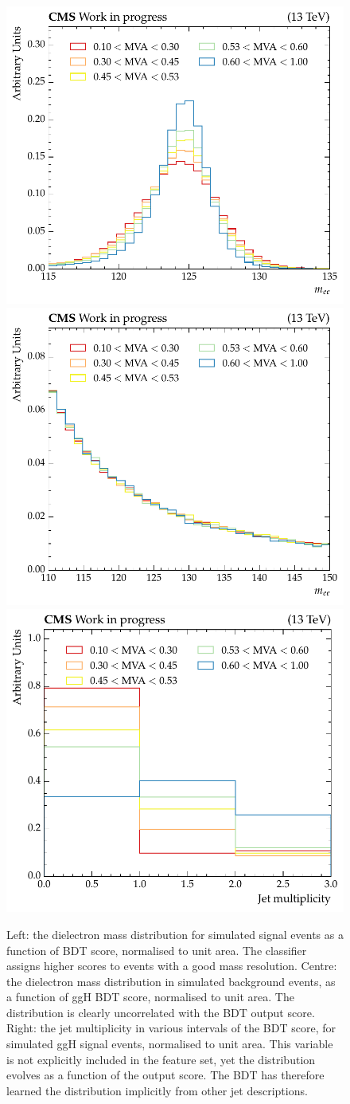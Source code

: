 \begin{figure}[htbp!] 
\centering 
\includegraphics[width =0.33\linewidth]{Figures/Hee/ggH/featureEvo/ggH_BDT_pt_reweighted_dielectronMass.pdf}
\includegraphics[width =0.33\linewidth]{Figures/Hee/ggH/featureEvo/ggH_BDT_pt_reweighted_dielectronMass_bkg.pdf}\hfill
\includegraphics[width =0.32\linewidth]{Figures/Hee/ggH/featureEvo/ggH_BDT_pt_reweighted_n_jets.pdf}\hfill

\caption[The dielectron invariant mass and jet multiplicity distributions as a function of the \ggH BDT output score.]{Left: the dielectron mass distribution for simulated \ggH signal events as a function of \ggH BDT score, normalised to unit area. The classifier assigns higher scores to events with a good mass resolution. Centre: the dielectron mass distribution in simulated background events, as a function of ggH BDT score, normalised to unit area. The distribution is clearly uncorrelated with the BDT output score. Right: the jet multiplicity in various intervals of the BDT score, for simulated ggH signal events, normalised to unit area. This variable is not explicitly included in the feature set, yet the distribution evolves as a function of the output score. The BDT has therefore learned the distribution implicitly from other jet descriptions.}
\label{fig:ggh_mee_and_njet_evo}
\end{figure}

